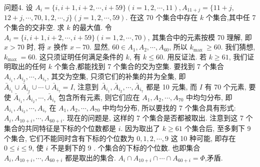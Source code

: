 问题4. 设 $A_i=\{i, i+1, i+2, \cdots, i+59\}(i=1,2, \cdots, 11), A_{11+j}=\{11+j$, $12+j, \cdots, 70,1,2, \cdots, j\}(j=1,2, \cdots, 59)$. 在这 70 个集合中存在 $k$ 个集合,其中任 7 个集合的交非空.
求 $k$ 的最大值.
令 $A_i=\{i, i+1, i+2, \cdots, i+59\}(i=1,2, \cdots, 70)$, 其集合中的元素按模 70 理解, 即 $x>70$ 时, 将 $x$ 换作 $x-70$. 显然, $60 \in A_1, A_2, \cdots, A_{60}$, 所以 $k_{\text {max }} \geqslant 60$. 我们猜想, $k_{\text {max }}=60$. 这只须证明任何满足条件的 $k$, 有 $k \leqslant 60$. 用反证法.
若 $k \geqslant 61$, 我们证明取出的任何 $k$ 个集合,都能找到 7 个集合的交为空集.
要找到 7 个集合 $A_{i_1}, A_{i_2}, \cdots, A_{i_7}$, 其交为空集, 只须它们的补集的并为全集, 即 $\bar{A}_{i_1} \cup \bar{A}_{i_2} \cup \cdots \cup \bar{A}_{i_7}=I$, 注意到 $\bar{A}_{i_1}, \bar{A}_{i_2}, \cdots, \bar{A}_{i_7}$ 都是 10 元集, 而 $I$ 有 70 个元素, 要使 $\bar{A}_{i_1}, \bar{A}_{i_2}, \cdots, \bar{A}_{i_7}$ 包含所有元素, 则它们应在 $A_1, A_2, \cdots, A_{70}$ 中均匀分布, 即 $A_{i_1}, A_{i_2}, \cdots, A_{i_7}$ 在 $A_1, A_2, \cdots, A_{70}$ 中均匀分布, 所以要找的 7 个集合具有形式: $A_i, A_{10+i}, \cdots, A_{60+i}$. 现在的问题是, 这样的 7 个集合是否都被取出.
注意到这 7 个集合的共同特征是下标的个位数都是 $i$. 因为取出了 $k \geqslant 61$ 个集合后, 至多剩下 9 个集合, 它们不能同时含有下标的个位数为 $0,1,2, \cdots, 9$ 这 10 种可能, 即存在 $0 \leqslant i \leqslant 9$, 使 $i$ 不是剩下的 9 . 个集合的下标的个位数.
也即集合 $A_i, A_{10+i}, \cdots, A_{60+i}$ 都是取出的集合.
 $A_i \cap A_{10+i} \cap \cdots \cap A_{60+i}=\Phi$,矛盾.



